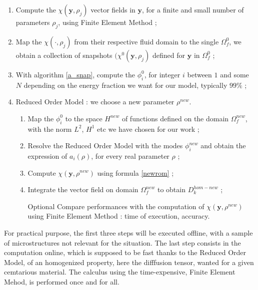 \begin{algo}\label{a_rom}
\begin{enumerate}[label=\textbf{S \hspace{-7pt} \Roman*}]
\item Compute the $\chi\left(\mathbf{y},\rho_j\right)$ vector fields in $\mathbf{y}$, for a finite and small number of parameters $\rho_j$, %
using Finite Element Method ;
\item Map the $\chi (\cdot,\rho_j)$ from their respective fluid domain to the single $\Omega_f^0$, we obtain a collection of snapshots $(\chi^0(\mathbf{y},\rho_j)$ %
defined for $\mathbf{y}$ in $\Omega_f^0$ ;
\item With algorithm \ref{a_snap}, compute the $\phi^0_i$, for integer $i$ between $1$ and some $N$ depending on the energy fraction we want for our model, typically $99\%$ ;
\item Reduced Order Model : we choose a new parameter $\rho^{new}$.
\begin{enumerate}[label=(\textbf{se}\ \roman*)]
\item Map the $\phi_i^0$ to the space $H^{new}$ of functions defined on the domain $\Omega_f^{new}$, with the norm $L^2$, $H^1$ etc we have chosen for our work ;
\item Resolve the Reduced Order Model with the modes $\phi_i^{new}$ and obtain the expression of $a_i(\rho)$, for every real parameter $\rho$ ;
\item Compute $\chi(\mathbf{y},\rho^{new})$ using formula \ref{newrom} ;
\item Integrate the vector field on domain $\Omega_f^{new}$ to obtain $D_k^{hom-new}$ ;
\item[Optional] Compare performances with the computation of $\chi(\mathbf{y},\rho^{new})$ using Finite Element Method : %
time of execution, accuracy.
\end{enumerate}
\end{enumerate}
\end{algo}

For practical purpose, the first three steps will be executed offline, with a sample of microstructures not relevant for the situation. %
The last step consists in the computation online, which is supposed to be fast thanks to the Reduced Order Model, %
of an homogenized property, here the difffusion tensor, wanted for a given cemtarious material.
The calculus using the time-expensive, Finite Element Mehod, is performed once and for all.